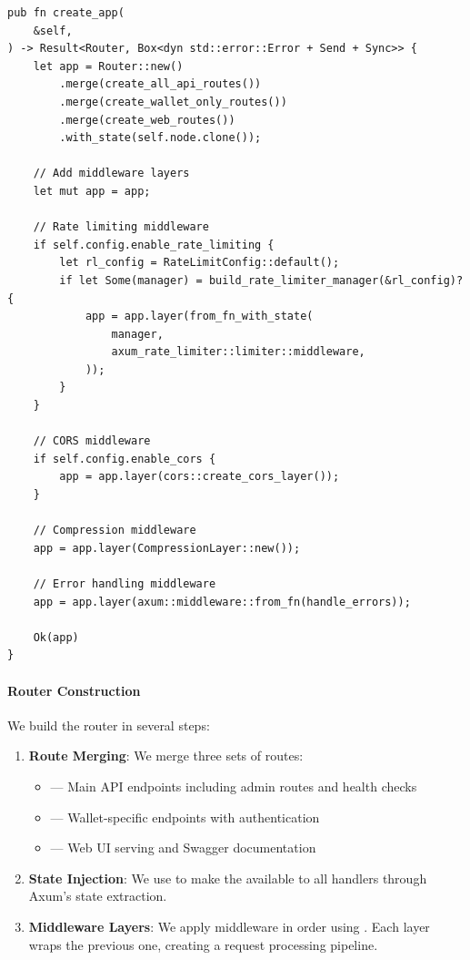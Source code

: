 \begin{listing}[htbp]
\caption{Building the complete application with router and middleware}
\label{lst:create-app}
\begin{verbatim}
pub fn create_app(
    &self,
) -> Result<Router, Box<dyn std::error::Error + Send + Sync>> {
    let app = Router::new()
        .merge(create_all_api_routes())
        .merge(create_wallet_only_routes())
        .merge(create_web_routes())
        .with_state(self.node.clone());

    // Add middleware layers
    let mut app = app;

    // Rate limiting middleware
    if self.config.enable_rate_limiting {
        let rl_config = RateLimitConfig::default();
        if let Some(manager) = build_rate_limiter_manager(&rl_config)? {
            app = app.layer(from_fn_with_state(
                manager,
                axum_rate_limiter::limiter::middleware,
            ));
        }
    }

    // CORS middleware
    if self.config.enable_cors {
        app = app.layer(cors::create_cors_layer());
    }

    // Compression middleware
    app = app.layer(CompressionLayer::new());

    // Error handling middleware
    app = app.layer(axum::middleware::from_fn(handle_errors));

    Ok(app)
}
\end{verbatim}
\end{listing}

\paragraph{Router Construction}
We build the router in several steps:

\begin{enumerate}
  \item \textbf{Route Merging}: We merge three sets of routes:
  \begin{itemize}
    \item {} --- Main API endpoints including admin routes and health checks
    \item {} --- Wallet-specific endpoints with authentication
    \item {} --- Web UI serving and Swagger documentation
  \end{itemize}

  \item \textbf{State Injection}: We use  to make the  available to all handlers through Axum's state extraction.

  \item \textbf{Middleware Layers}: We apply middleware in order using . Each layer wraps the previous one, creating a request processing pipeline.
\end{enumerate}

